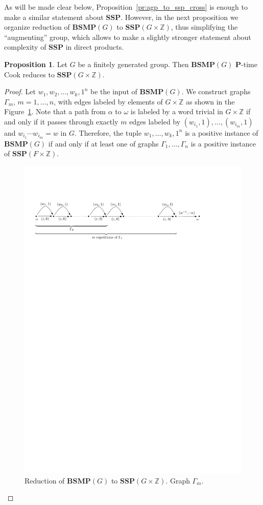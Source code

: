 \documentclass[10pt]{amsart}
\theoremstyle{definition}
\newtheorem{proposition}[theorem]{Proposition}
\def\P{{\mathbf{P}}}
\def\SSP{{\mathbf{SSP}}}
\def\BSMP{{\mathbf{BSMP}}}
\begin{document}
As will be made clear below, Proposition~\ref{pr:agp_to_ssp_cross} is enough to make a similar statement about $\SSP$. However, in the next proposition we organize reduction of $\BSMP(G)$ to $\SSP(G\times \mathbb Z)$, thus simplifying the ``augmenting'' group, which allows to make a slightly stronger statement about complexity of $\SSP$ in direct products.

\begin{proposition}\label{pr:bsmp_to_ssp}
Let $G$ be a finitely generated group. Then $\BSMP(G)$ $\P$-time Cook reduces to $\SSP(G\times \mathbb Z)$.
\end{proposition}
\begin{proof} Let $w_1,w_2,\ldots, w_k, 1^n$ be the input of $\BSMP(G)$. We construct graphs $\Gamma_m$, $m=1,\ldots, n$, with edges labeled by elements of $G\times \mathbb Z$ as shown in the Figure~\ref{fi:bsmp_to_ssp}. Note that a path from $\alpha$ to $\omega$ is labeled by a word trivial in $G\times\mathbb Z$ if and only if it passes through exactly $m$ edges labeled by $(w_{i_1},1),\ldots,(w_{i_m},1)$ and $w_{i_1}\cdots w_{i_m}=w$ in $G$. Therefore, the tuple $w_1,\ldots,w_k,1^n$ is a positive instance of $\BSMP(G)$ if and only if at least one of graphs $\Gamma_1,\ldots, \Gamma_n$ is a positive instance of $\SSP(F\times\mathbb Z)$.
\begin{figure}[h]
 \centering
 \includegraphics[width=6in]{bsmp_to_ssp.pdf}
 \caption{Reduction of $\BSMP(G)$ to $\SSP(G\times \mathbb Z)$. Graph $\Gamma_m$.} \label{fi:bsmp_to_ssp}
\end{figure}
\end{proof}
\end{document}
